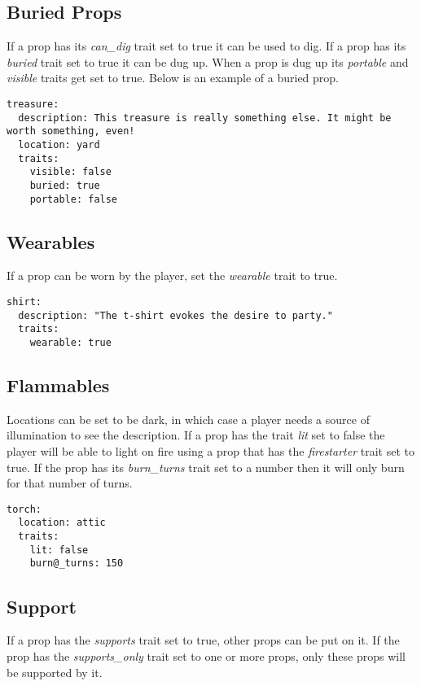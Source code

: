 \documentclass[letterpaper,10pt,english]{sphinxmanual}
\begin{document}
\subsection{Buried Props}
\label{elements:buried-props}
If a prop has its \emph{can\_dig} trait set to true it can be used to dig. If a prop has its \emph{buried} trait set to true it can be dug up. When a prop is dug up its \emph{portable} and \emph{visible} traits get set to true. Below is an example of a buried prop.

\begin{Verbatim}[commandchars=@\[\]]
treasure:
  description: This treasure is really something else. It might be worth something, even!
  location: yard
  traits:
    visible: false
    buried: true
    portable: false
\end{Verbatim}


\subsection{Wearables}
\label{elements:wearables}
If a prop can be worn by the player, set the \emph{wearable} trait to true.

\begin{Verbatim}[commandchars=@\[\]]
shirt:
  description: "The t-shirt evokes the desire to party."
  traits:
    wearable: true
\end{Verbatim}


\subsection{Flammables}
\label{elements:flammables}
Locations can be set to be dark, in which case a player needs a source of illumination to see the description. If a prop has the trait \emph{lit} set to false the player will be able to light on fire using a prop that has the \emph{firestarter} trait set to true. If the prop has its \emph{burn\_turns} trait set to a number then it will only burn for that number of turns.

\begin{Verbatim}[commandchars=@\[\]]
torch:
  location: attic
  traits:
    lit: false
    burn@_turns: 150
\end{Verbatim}


\subsection{Support}
\label{elements:support}
If a prop has the \emph{supports} trait set to true, other props can be put on it. If the prop has the \emph{supports\_only} trait set to one or more props, only these props will be supported by it.
\end{document}
